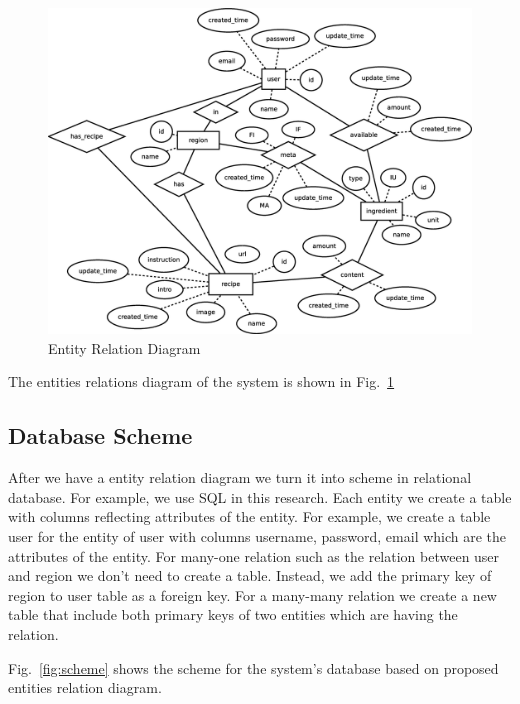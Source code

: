\begin{figure}
\centering
\includegraphics[scale=0.35]{ER.eps}
\caption{Entity Relation Diagram}
\label{fig:ER}

\end{figure}

The entities relations diagram of the system is shown in Fig.~\ref{fig:ER}

\subsection{Database Scheme}

After we have a entity relation diagram we turn it into scheme in relational database. For example, we use SQL in this research. Each entity we create a table with columns reflecting attributes of the entity. For example, we create a table user for the entity of user with columns username, password, email which are the attributes of the entity. For many-one relation such as the relation between user and region we don't need to create a table. Instead, we add the primary key of region to user table as a foreign key. For a many-many relation we create a new table that include both primary keys of two entities which are having the relation.

Fig.~\ref{fig:scheme} shows the scheme for the system's database based on proposed entities relation diagram.

